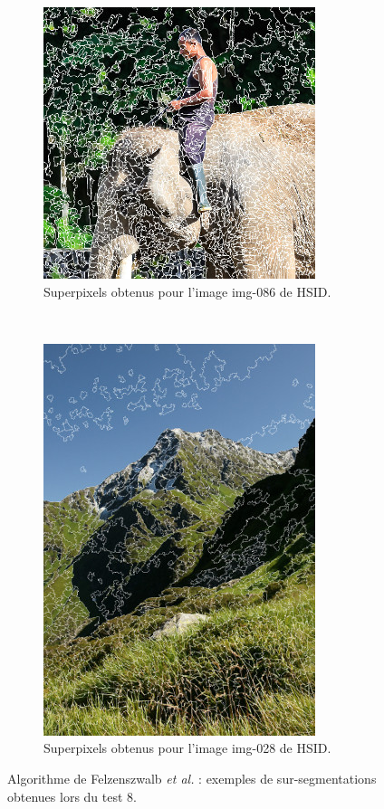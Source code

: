  \begin{figure}[htb]
	\centering
	 \begin{subfigure}[t]{0.55\textwidth}	
			\includegraphics[height=0.4\textheight]{images/sur-segmentation/FZ/EX1-img-086}
		 	\caption{Superpixels obtenus pour l'image img-086 de HSID.}
	\end{subfigure}
	~ 
	 \begin{subfigure}[t]{0.4\textwidth}	
			\includegraphics[height=0.4\textheight]{images/sur-segmentation/FZ/EX2-img-028}
		 	\caption{Superpixels obtenus pour l'image img-028 de HSID.}
	\end{subfigure}
	\caption{Algorithme de Felzenszwalb \textit{et al.} : exemples de sur-segmentations obtenues lors du test 8. }
	\label{fig:sp:exfz1}
\end{figure}
 

